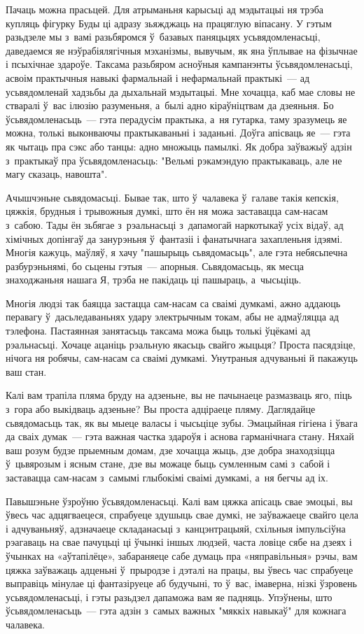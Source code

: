 Пачаць можна прасьцей. Для атрыманьня карысьці ад мэдытацыі ня трэба купляць фігурку Буды ці адразу зьяжджаць на працяглую віпасану. У гэтым разьдзеле мы з~вамі разьбяромся ў~базавых паняцьцях усьвядомленасьці, даведаемся яе нэўрабіялягічныя мэханізмы, вывучым, як яна ўплывае на фізычнае і псыхічнае здароўе. Таксама разьбяром асноўныя кампанэнты ўсьвядомленасьці, асвоім практычныя навыкі фармальнай і нефармальнай практыкі~--- ад усьвядомленай хадзьбы да дыхальнай мэдытацыі. Мне хочацца, каб мае словы не стваралі ў~вас ілюзію разуменьня, а~былі адно кіраўніцтвам да дзеяньня. Бо ўсьвядомленасьць~--- гэта перадусім практыка, а~ня гутарка, таму зразумець яе можна, толькі выконваючы практыкаваньні і заданьні. Доўга апісваць яе~--- гэта як чытаць пра сэкс або танцы: адно множыць памылкі. Як добра заўважыў адзін з~практыкаў пра ўсьвядомленасьць: "Вельмі рэкамэндую практыкаваць, але не магу сказаць, навошта".

Ачышчэньне сьвядомасьці. Бывае так, што ў~чалавека ў~галаве такія кепскія, цяжкія, брудныя і трывожныя думкі, што ён ня можа заставацца сам-насам з~сабою. Тады ён зьбягае з~рэальнасьці з~дапамогай наркотыкаў усіх відаў, ад хімічных допінгаў да занурэньня ў~фантазіі і фанатычнага захапленьня ідэямі. Многія кажуць, маўляў, я хачу "пашырыць сьвядомасьць", але гэта небясьпечна разбурэньнямі, бо сьцены гэтыя~--- апорныя. Сьвядомасьць, як месца знаходжаньня нашага Я, трэба не пакідаць ці пашыраць, а~чысьціць.

Многія людзі так баяцца застацца сам-насам са сваімі думкамі, ажно аддаюць перавагу ў~дасьледаваньнях удару электрычным токам, абы не адмаўляцца ад тэлефона. Пастаянная занятасьць таксама можа быць толькі ўцёкамі ад рэальнасьці. Хочаце ацаніць рэальную якасьць свайго жыцьця? Проста пасядзіце, нічога ня робячы, сам-насам са сваімі думкамі. Унутраныя адчуваньні й пакажуць ваш стан.

Калі вам трапіла пляма бруду на адзеньне, вы не пачынаеце размазваць яго, піць з~гора або выкідваць адзеньне? Вы проста адціраеце пляму. Даглядайце сьвядомасьць так, як вы мыеце валасы і чысьціце зубы. Эмацыйная гігіена і ўвага да сваіх думак~--- гэта важная частка здароўя і аснова гарманічнага стану. Няхай ваш розум будзе прыемным домам, дзе хочацца жыць, дзе добра знаходзіцца ў~цьвярозым і ясным стане, дзе вы можаце быць сумленным самі з~сабой і заставацца сам-насам з~самымі глыбокімі сваімі думкамі, а~ня бегчы ад іх.

Павышэньне ўзроўню ўсьвядомленасьці. Калі вам цяжка апісаць свае эмоцыі, вы ўвесь час адцягваецеся, спрабуеце здушыць свае думкі, не заўважаеце свайго цела і адчуваньняў, адзначаеце складанасьці з~канцэнтрацыяй, схільныя імпульсіўна рэагаваць на свае пачуцьці ці ўчынкі іншых людзей, часта ловіце сябе на дзеях і ўчынках на «аўтапілёце», забараняеце сабе думаць пра «няправільныя» рэчы, вам цяжка заўважаць адценьні ў~прыродзе і дэталі на працы, вы ўвесь час спрабуеце выправіць мінулае ці фантазіруеце аб будучыні, то ў~вас, імаверна, нізкі ўзровень усьвядомленасьці, і гэты разьдзел дапаможа вам яе падняць. Упэўнены, што ўсьвядомленасьць~--- гэта адзін з~самых важных "мяккіх навыкаў" для кожнага чалавека.

